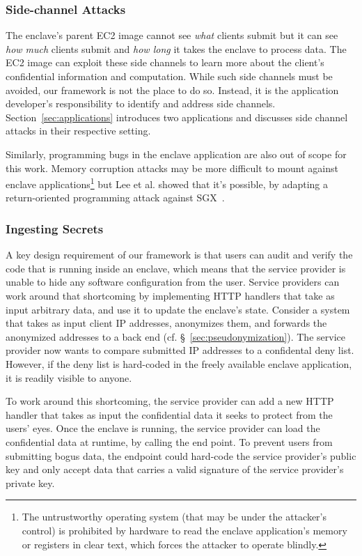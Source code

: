 \subsubsection{Side-channel Attacks}
\label{sec:side-channels}

The enclave's parent EC2 image cannot see \emph{what} clients submit but it can
see \emph{how much} clients submit and \emph{how long} it takes the enclave to
process data.  The EC2 image can exploit these side channels to learn more
about the client's confidential information and computation.  While such side
channels must be avoided, our framework is not the place to do so.  Instead, it
is the application developer's responsibility to identify and address side
channels.  Section~\ref{sec:applications} introduces two applications and
discusses side channel attacks in their respective setting.

Similarly, programming bugs in the enclave application are also out of scope for
this work.  Memory corruption attacks may be more difficult to mount against
enclave applications\footnote{The untrustworthy operating system (that may be
under the attacker's control) is prohibited by hardware to read the enclave
application's memory or registers in clear text, which forces the attacker to
operate blindly.} but Lee et al. showed that it's possible, by adapting a
return-oriented programming attack against SGX~\cite{Lee2017a}.

\subsubsection{Ingesting Secrets}
\label{sec:secrets}

A key design requirement of our framework is that users can audit and verify the
code that is running inside an enclave, which means that the service provider is
unable to hide any software configuration from the user.  Service providers can
work around that shortcoming by implementing HTTP handlers that take as input
arbitrary data, and use it to update the enclave's state.  Consider a system
that takes as input client IP addresses, anonymizes them, and forwards the
anonymized addresses to a back end (cf. \S~\ref{sec:pseudonymization}).  The
service provider now wants to compare submitted IP addresses to a confidental
deny list.  However, if the deny list is hard-coded in the freely available
enclave application, it is readily visible to anyone.

To work around this shortcoming, the service provider can add a new HTTP handler
that takes as input the confidential data it seeks to protect from the users'
eyes.  Once the enclave is running, the service provider can load the
confidential data at runtime, by calling the end point.  To prevent users from
submitting bogus data, the endpoint could hard-code the service provider's
public key and only accept data that carries a valid signature of the service
provider's private key.

